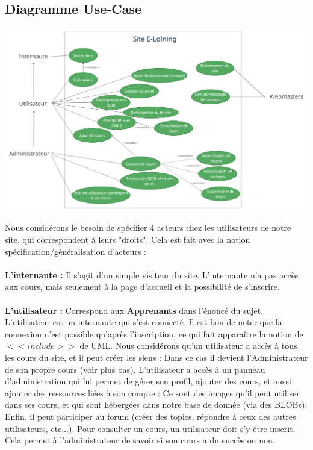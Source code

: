 \documentclass[a4paper,10pt]{article}
\begin{document}
\subsection{Diagramme Use-Case}
\centerline{
    \includegraphics[width=19cm]{images/UseCase.png}
}
Nous considérons le besoin de spécifier 4 acteurs chez les utilisateurs de notre site, qui correspondent à leurs "droits". Cela est fait avec la notion spécification/généralisation d'acteurs :\\\\

\textbf{L'internaute :} Il s'agit d'un simple visiteur du site. L'internaute n'a pas accès aux cours, mais seulement à la page d'accueil et la possibilité de s'inscrire.\\\\

\textbf{L'utilisateur :} Correspond aux \textbf{Apprenants} dans l'énoncé du sujet. L'utilisateur est un internaute qui s'est connecté. Il est bon de noter que la connexion n'est possible qu'après l'inscription, ce qui fait apparaître la notion de $<<include>>$ de UML. Nous considérons qu'un utilisateur a accès à tous les cours du site, et il peut créer les siens : Dans ce cas il devient l'Administrateur de son propre cours (voir plus bas).
L'utilisateur a accès à un panneau d'administration qui lui permet de gérer son profil, ajouter des cours, et aussi ajouter des ressources liées à son compte : Ce sont des images qu'il peut utiliser dans ses cours, et qui sont hébergées dans notre base de donnée (via des BLOBs). Enfin, il peut participer au forum (créer des topics, répondre à ceux des autres utilisateurs, etc...).
Pour consulter un cours, un utilisateur doit s'y être inscrit. Cela permet à l'administrateur de savoir si son cours a du succès ou non.\\\\
\end{document}
